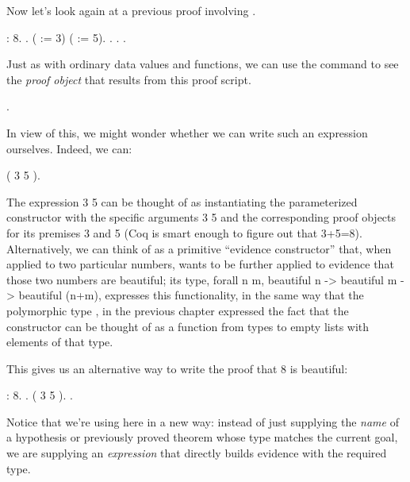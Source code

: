 \documentclass[12pt]{report}
\begin{document}
 Now let's look again at a previous proof involving . \begin{coqdoccode}
\coqdocemptyline
\coqdocnoindent
{} :  8.\coqdoceol
\coqdocnoindent
{}.\coqdoceol
\coqdocindent{2.00em}
   ( := 3) ( := 5).\coqdoceol
\coqdocindent{2.00em}
 .\coqdoceol
\coqdocindent{2.00em}
 . .\coqdoceol
\coqdocemptyline
\end{coqdoccode}
Just as with ordinary data values and functions, we can use the 
command to see the \textit{proof object} that results from this proof script. \begin{coqdoccode}
\coqdocemptyline
\coqdocnoindent
{} .\coqdoceol
\coqdocemptyline
\end{coqdoccode}
In view of this, we might wonder whether we can write such
    an expression ourselves. Indeed, we can: \begin{coqdoccode}
\coqdocemptyline
\coqdocnoindent
{} ( 3 5  ).\coqdoceol
\coqdocemptyline
\end{coqdoccode}
The expression  3 5   can be thought of as
    instantiating the parameterized constructor  with the
    specific arguments 3 5 and the corresponding proof objects for
    its premises  3 and  5 (Coq is smart enough
    to figure out that 3+5=8).  Alternatively, we can think of 
    as a primitive ``evidence constructor'' that, when applied to two
    particular numbers, wants to be further applied to evidence that
    those two numbers are beautiful; its type, 
    forall n m, beautiful n -> beautiful m -> beautiful (n+m),
    expresses this functionality, in the same way that the polymorphic
    type \coqdockw{\ensuremath{\forall}} ,   in the previous chapter expressed the fact
    that the constructor  can be thought of as a function from
    types to empty lists with elements of that type. 

 This gives us an alternative way to write the proof that 8 is
    beautiful: \begin{coqdoccode}
\coqdocemptyline
\coqdocnoindent
{} :  8.\coqdoceol
\coqdocnoindent
{}.\coqdoceol
\coqdocindent{1.50em}
 ( 3 5  ).\coqdoceol
\coqdocnoindent
{}.\coqdoceol
\coqdocemptyline
\end{coqdoccode}
Notice that we're using  here in a new way: instead of just
    supplying the \textit{name} of a hypothesis or previously proved theorem
    whose type matches the current goal, we are supplying an
    \textit{expression} that directly builds evidence with the required
    type. \begin{coqdoccode}
\coqdocemptyline
\end{coqdoccode}
\end{document}
